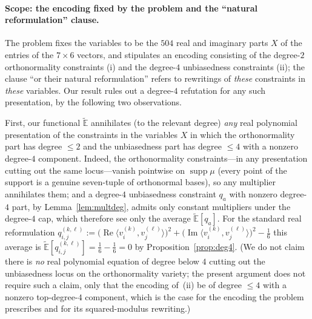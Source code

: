 \documentclass{amsart}
\theoremstyle{definition}
\theoremstyle{remark}
\begin{document}
\paragraph{Scope: the encoding fixed by the problem and the ``natural reformulation'' clause.}
The problem fixes the variables to be the $504$ real and imaginary parts $X$ of the entries of
the $7\times6$ vectors, and stipulates an encoding consisting of the degree-$2$ orthonormality
constraints (i) and the degree-$4$ unbiasedness constraints (ii); the clause ``or their natural
reformulation'' refers to rewritings of \emph{these} constraints in \emph{these} variables. Our
result rules out a degree-$4$ refutation for any such presentation, by the following two
observations.

First, our functional $\widetilde{\mathbb{E}}$ annihilates (to the relevant degree) \emph{any}
real polynomial presentation of the constraints in the variables $X$ in which the orthonormality
part has degree $\le2$ and the unbiasedness part has degree $\le4$ with a nonzero degree-$4$
component. Indeed, the orthonormality constraints---in any presentation cutting out the same
locus---vanish pointwise on $\operatorname{supp}\mu$ (every point of the support is a genuine
seven-tuple of orthonormal bases), so any multiplier annihilates them; and a degree-$4$
unbiasedness constraint $q_a$ with nonzero degree-$4$ part, by Lemma~\ref{lem:multdeg}, admits
only constant multipliers under the degree-$4$ cap, which therefore see only the average
$\widetilde{\mathbb{E}}[q_a]$. For the standard real reformulation
$q^{(k,\ell)}_{i,j}:=\bigl(\operatorname{Re}\langle v^{(k)}_i,v^{(\ell)}_j\rangle\bigr)^2
+\bigl(\operatorname{Im}\langle v^{(k)}_i,v^{(\ell)}_j\rangle\bigr)^2-\tfrac16$ this average is
$\widetilde{\mathbb{E}}[q^{(k,\ell)}_{i,j}]=\tfrac16-\tfrac16=0$ by
Proposition~\ref{prop:deg4}. (We do not claim there is \emph{no} real polynomial equation of
degree below $4$ cutting out the unbiasedness locus on the orthonormality variety; the present
argument does not require such a claim, only that the encoding of~(ii) be of degree $\le4$ with
a nonzero top-degree-$4$ component, which is the case for the encoding the problem prescribes and
for its squared-modulus rewriting.)
\end{document}
